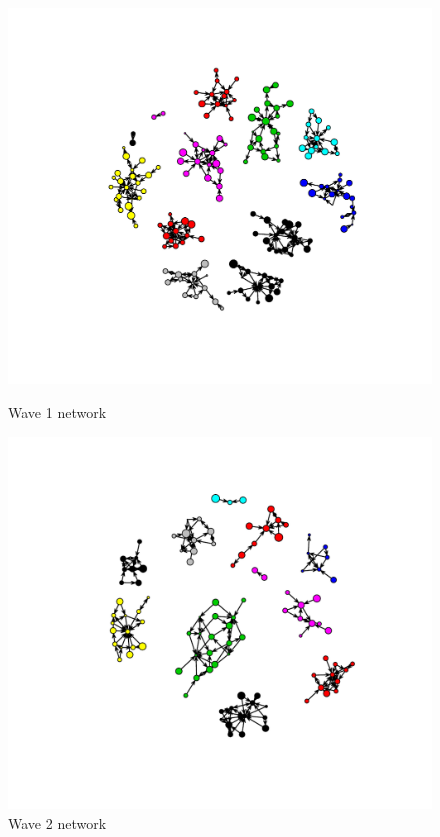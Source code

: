 \documentclass[12pt]{article} %
\numberwithin{equation}{section}		%
\numberwithin{figure}{section}			%
\numberwithin{table}{section}				%
\begin{document}
\begin{figure}[!ht]
\centering
\begin{minipage}{.45\textwidth}
\centering
      \includegraphics[width=\linewidth]{wave1plotT.pdf}
      \caption{Wave 1 network}\label{fig:x1}
\end{minipage}
\begin{minipage}{.45\textwidth}
\centering
\includegraphics[width=\linewidth]{wave2plot.pdf}
      \caption{Wave 2 network}\label{fig:x2}
      \end{minipage}
\end{figure}
\end{document}
